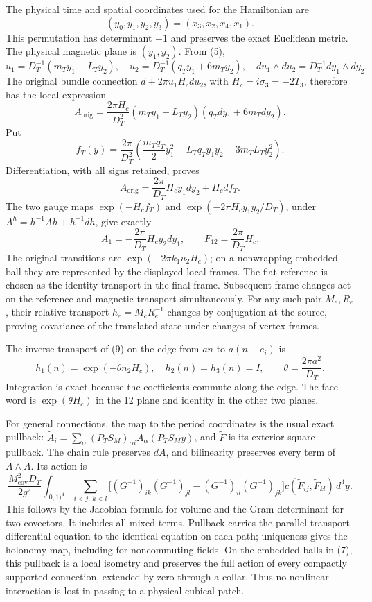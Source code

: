\documentclass[
  11pt,
]{article}
\begin{document}
The physical time and spatial coordinates used for the Hamiltonian are
\[
 (y_0,y_1,y_2,y_3)=(x_3,x_2,x_4,x_1).
\tag{8}
\] This permutation has determinant \(+1\) and preserves the exact
Euclidean metric. The physical magnetic plane is \((y_1,y_2)\). From
(5), \[
 u_1=D_T^{-1}(m_Ty_1-L_Ty_2),\quad
 u_2=D_T^{-1}(q_Ty_1+6m_Ty_2),\quad
 du_1\wedge du_2=D_T^{-1}dy_1\wedge dy_2.
\] The original bundle connection \(d+2\pi u_1H_cdu_2\), with
\(H_c=i\sigma_3=-2T_3\), therefore has the local expression \[
 A_{\mathrm{orig}}=\frac{2\pi H_c}{D_T^2}
 (m_Ty_1-L_Ty_2)(q_Tdy_1+6m_Tdy_2).
\] Put \[
 f_T(y)=\frac{2\pi}{D_T^2}
 \left(\frac{m_Tq_T}{2}y_1^2-L_Tq_Ty_1y_2-3m_TL_Ty_2^2\right).
\] Differentiation, with all signs retained, proves \[
 A_{\mathrm{orig}}=\frac{2\pi}{D_T}H_cy_1dy_2+H_cdf_T.
\] The two gauge maps \(\exp(-H_cf_T)\) and
\(\exp(-2\pi H_cy_1y_2/D_T)\), under \(A^h=h^{-1}Ah+h^{-1}dh\), give
exactly \[
 A_1=-\frac{2\pi}{D_T}H_cy_2dy_1,\qquad
 F_{12}=\frac{2\pi}{D_T}H_c.
\tag{9}
\] The original transitions are \(\exp(-2\pi k_1u_2H_c)\); on a
nonwrapping embedded ball they are represented by the displayed local
frames. The flat reference is chosen as the identity transport in the
final frame. Subsequent frame changes act on the reference and magnetic
transport simultaneously. For any such pair \(M_e,R_e\), their relative
transport \(h_e=M_eR_e^{-1}\) changes by conjugation at the source,
proving covariance of the translated state under changes of vertex
frames.

The inverse transport of (9) on the edge from \(an\) to \(a(n+e_i)\) is
\[
 h_1(n)=\exp(-\theta n_2H_c),\quad h_2(n)=h_3(n)=I,
 \qquad \theta=\frac{2\pi a^2}{D_T}.
\tag{10}
\] Integration is exact because the coefficients commute along the edge.
The face word is \(\exp(\theta H_c)\) in the 12 plane and identity in
the other two planes.

For general connections, the map to the period coordinates is the usual
exact pullback:
\(\widetilde A_i=\sum_\alpha(P_TS_M)_{\alpha i}A_\alpha(P_TS_My)\), and
\(\widetilde F\) is its exterior-square pullback. The chain rule
preserves \(dA\), and bilinearity preserves every term of \(A\wedge A\).
Its action is \[
 \frac{M_{\mathrm{cov}}^2D_T}{2g^2}
 \int_{[0,1)^4}\sum_{i<j,\,k<l}
 \bigl[(G^{-1})_{ik}(G^{-1})_{jl}-(G^{-1})_{il}(G^{-1})_{jk}\bigr]
 c(\widetilde F_{ij},\widetilde F_{kl})\,d^4y.
\tag{11}
\] This follows by the Jacobian formula for volume and the Gram
determinant for two covectors. It includes all mixed terms. Pullback
carries the parallel-transport differential equation to the identical
equation on each path; uniqueness gives the holonomy map, including for
noncommuting fields. On the embedded balls in (7), this pullback is a
local isometry and preserves the full action of every compactly
supported connection, extended by zero through a collar. Thus no
nonlinear interaction is lost in passing to a physical cubical patch.
\end{document}
